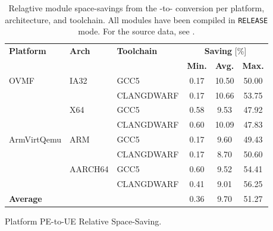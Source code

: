 \begin{table}[htbp]
  \centering
  \begin{tabular}{l l l c c c}
    \toprule
    \multirow{2}{*}[-2pt]{\textbf{Platform}} & \multirow{2}{*}[-2pt]{\textbf{Arch}} & \multirow{2}{*}[-2pt]{\textbf{Toolchain}} & \multicolumn{3}{c}{\textbf{Saving} [\%]}\\
    \cmidrule{4-6}
     & & & \textbf{Min.} & \textbf{Avg.} & \textbf{Max.}\\
    \midrule
    \multirow{4}{*}[-2pt]{\gls{OVMF}} & \multirow{2}{*}{IA32} & GCC5 & 0.17 & 10.50 & 50.00\\
     & & CLANGDWARF & 0.17 & 10.66 & 53.75\\
    \cmidrule{2-6}
     & \multirow{2}{*}{X64} & GCC5 & 0.58 & 9.53 & 47.92\\
     & & CLANGDWARF & 0.60 & 10.09 & 47.83\\
    \midrule
    \multirow{4}{*}[-2pt]{\gls{ArmVirtQemu}} & \multirow{2}{*}{ARM} & GCC5 & 0.17 & 9.60 & 49.43\\
     & & CLANGDWARF & 0.17 & 8.70 & 50.60\\
    \cmidrule{2-6}
     & \multirow{2}{*}{AARCH64} & GCC5 & 0.60 & 9.52 & 54.41\\
     & & CLANGDWARF & 0.41 & 9.01 & 56.25\\
    \midrule
    \midrule
    \textbf{Average} & & & 0.36 & 9.70 & 51.27\\
    \bottomrule
  \end{tabular}
  \caption{Platform PE-to-UE Relative Space-Saving.}
  \label{fig:rel_space_sav}
  \caption*{Relagtive module space-savings from the -to- conversion per platform, architecture, and toolchain. All modules have been compiled in \texttt{RELEASE} mode. For the source data, see .}
\end{table}
